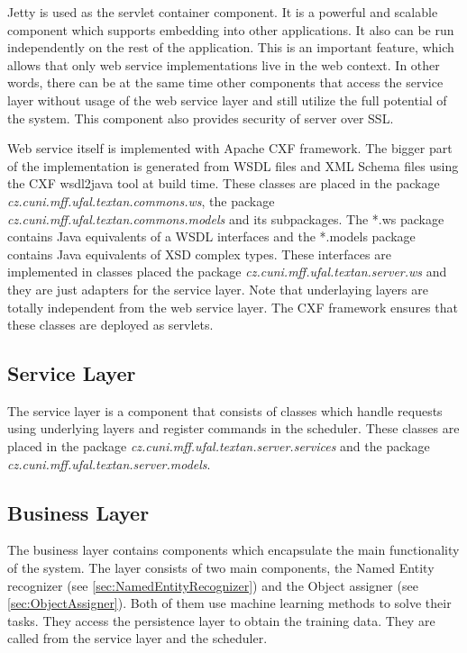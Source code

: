 Jetty is used as the servlet container component. It is a powerful and scalable
component which supports embedding into other applications.
It also can be run independently on the rest of the application. This is an
important feature, which allows that only web service implementations live in the
web context. In other words, there can be at the same time other components that
access the service layer without usage of the web service layer and still utilize
the full potential of the system. This component also provides security of \textan
server over SSL.

Web service itself is implemented with Apache CXF framework. The bigger part of
the implementation is generated from WSDL files and XML Schema files using the
CXF wsdl2java tool at build time. These classes are placed in the package
\emph{cz.\-cuni.\-mff.\-ufal.\-textan.\-commons.\-ws}, the package
\emph{cz.\-cuni.\-mff.\-ufal.\-textan.\-commons.\-models} and its subpackages.
The *.ws package contains Java equivalents of a WSDL interfaces and the *.models
package contains Java equivalents of XSD complex types. These interfaces are
implemented in classes placed the package \emph{cz.\-cuni.\-mff.\-ufal.\-textan.\-server.\-ws}
and they are just adapters for the service layer. Note that underlaying layers
are totally independent from the web service layer. The CXF framework ensures
that these classes are deployed as servlets.

\subsection{Service Layer}
The service layer is a component that consists of classes which handle requests
using underlying layers and register commands in the scheduler. These classes
are placed in the package \emph{cz.\-cuni.\-mff.\-ufal.\-textan.\-server.\-services}
and the package \emph{cz.\-cuni.\-mff.\-ufal.\-textan.\-server.\-models}.


\subsection{Business Layer}
The business layer contains components which encapsulate the main functionality
of the system. The layer consists of two main components, the Named Entity
recognizer (see \autoref{sec:NamedEntityRecognizer}) and the Object assigner 
(see \autoref{sec:ObjectAssigner}). Both of them use machine learning methods to
solve their tasks. They access the persistence layer to obtain the training
data. They are called from the service layer and the scheduler.


